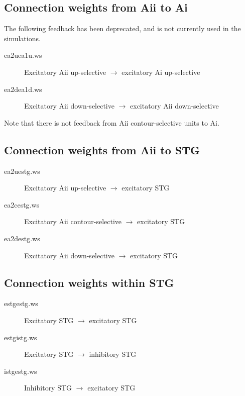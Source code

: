\documentclass[12pt]{article}
\begin{document}
\subsection{Connection weights from Aii to Ai}
The following feedback has been deprecated, and is not currently used
in the simulations. 
\begin{description}
  \item[ea2uea1u.ws] Excitatory Aii up-selective $\rightarrow$
                     excitatory Ai up-selective
  \item[ea2dea1d.ws] Excitatory Aii down-selective $\rightarrow$
                     excitatory Aii down-selective
\end{description}
Note that there is not feedback from Aii contour-selective units to
Ai. 

\subsection{Connection weights from Aii to STG}
\begin{description}
  \item[ea2uestg.ws] Excitatory Aii up-selective $\rightarrow$
                     excitatory STG
  \item[ea2cestg.ws] Excitatory Aii contour-selective $\rightarrow$
                     excitatory STG
  \item[ea2destg.ws] Excitatory Aii down-selective $\rightarrow$
                     excitatory STG 
\end{description}

\subsection{Connection weights within STG}
\begin{description}
  \item[estgestg.ws] Excitatory STG $\rightarrow$ excitatory STG
  \item[estgistg.ws] Excitatory STG $\rightarrow$ inhibitory STG
  \item[istgestg.ws] Inhibitory STG $\rightarrow$ excitatory STG
\end{description}
\end{document}
